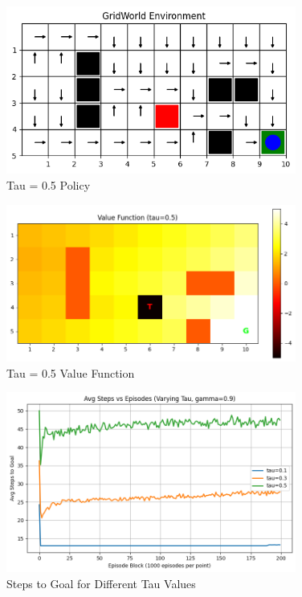 \documentclass[12pt]{article}
\begin{document}
\begin{figure}[H]
  \centering
  \includegraphics[width=0.85\textwidth]{images/part2_q3_tau_0.5_policy.png}
  \caption{Tau = 0.5 Policy}
\end{figure}
\begin{figure}[H]
  \centering
  \includegraphics[width=0.85\textwidth]{images/part2_q3_tau_0.5_value.png}
  \caption{Tau = 0.5 Value Function}
\end{figure}

\begin{figure}[H]
  \centering
  \includegraphics[width=0.85\textwidth]{images/part2_q3_steps_vs_tau.png}
  \caption{Steps to Goal for Different Tau Values}
\end{figure}
\end{document}
